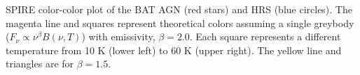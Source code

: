 \label{fig:color-color} SPIRE color-color plot of the BAT AGN (red stars) and HRS (blue circles). The magenta line and squares represent theoretical colors assuming a single greybody ($F_{\nu} \propto \nu^{\beta}B(\nu, T)$) with emissivity, $\beta=2.0$. Each square represents a different temperature from 10 K (lower left) to 60 K (upper right). The yellow line and triangles are for $\beta=1.5$.